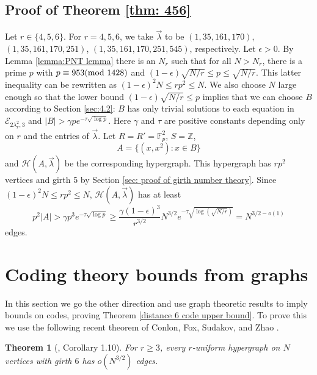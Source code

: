\documentclass[12pt]{article}%
\newtheorem{theorem}{Theorem}[section]
\begin{document}

\subsection{Proof of Theorem \ref{thm: 456}}

Let $r \in \{4,5,6 \}$.  For $r = 4,5,6$, we take $\vec{ \lambda}$ to be $(1,35,161,170)$, $(1,35,161,170,251)$, $(1,35,161,170,251,545)$, respectively.  Let $\epsilon > 0$.   
By Lemma \ref{lemma:PNT lemma} there is an $N_r$ such that 
for all $N > N_r$, there is a prime $p$ with $p \equiv 953 ( \textup{mod}~1428)$ and 
$(1 - \epsilon ) \sqrt{N/r} \leq p \leq 
\sqrt{N / r}$.   
This latter inequality can be rewritten as $(1 - \epsilon)^2 N \leq r p^2 \leq N$.  
We also choose $N$ large enough so that the lower bound 
$(1 - \epsilon ) \sqrt{N/r} \leq p$ implies that we can choose $B$ according to Section \ref{sec:4.2}: $B$ has only trivial solutions to each equation in $\mathcal{E}_{ 2 \lambda_r^2 , 3}$ and 
$|B| > \gamma p e^{ - \tau  \sqrt{ \log p} }$.  Here $\gamma$ and $\tau$ are positive constants depending only on $r$ and the entries of $\vec{ \lambda}$.  Let
$R = R' = \mathbb{F}_p^2$, $S = \mathbb{Z}$, 
\[
A  = \{ ( x,x^2) : x \in B \}
\]
and $\mathcal{H} ( A , \vec{ \lambda} )$ be the corresponding hypergraph.  
This hypergraph has $rp^2$ vertices and girth 5 by Section \ref{sec: proof of girth number theory}.  Since $(1 - \epsilon )^2 N \leq rp^2 \leq N$, $\mathcal{H}(A , \vec{ \lambda})$ has at least 
\[
p^2 |A| > \gamma p^3 e^{  - \tau \sqrt{ \log p } } \geq \frac{\gamma(1-\epsilon)^3}{r^{3/2}}N^{3/2} e^{-\tau \sqrt{\log(\sqrt{N/r})}} = N^{3/2-o(1)}
\]
edges.  



\section{Coding theory bounds from graphs}\label{sec: sphere packing}


In this section we go the other direction and use graph theoretic results to imply bounds on codes, proving Theorem \ref{distance 6 code upper bound}. To prove this we use the following recent theorem of Conlon, Fox, Sudakov, and Zhao \cite{conlon}.

\begin{theorem}[\cite{conlon}, Corollary 1.10]\label{girth 6 upper bound}
    For $r\geq 3$, every $r$-uniform hypergraph on $N$ vertices with girth $6$ has $o(N^{3/2})$ edges.
\end{theorem}
\end{document}
